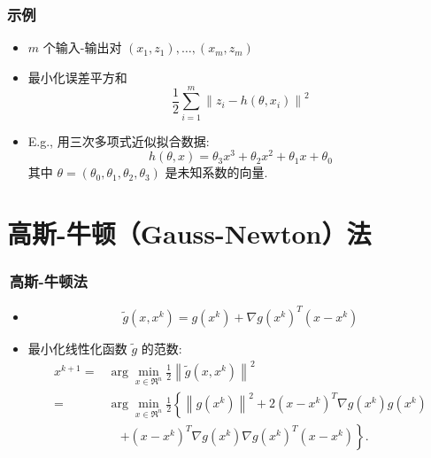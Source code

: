 \documentclass[11pt]{beamer}
\begin{document}
\begin{frame}
	\frametitle{示例}
	

	
	\begin{itemize}

\item{} $m$ 个输入-输出对 $\left(x_{1}, z_{1}\right), \ldots,\left(x_{m}, z_{m}\right)$

\item {}  最小化误差平方和
	$$
	\frac{1}{2} \sum_{i=1}^{m}\left\|z_{i}-h\left(\theta, x_{i}\right)\right\|^{2}
	$$
	\item E.g.,   用三次多项式近似拟合数据:
	$$
	h(\theta, x)=\theta_{3} x^{3}+\theta_{2} x^{2}+\theta_{1} x+\theta_{0}
	$$
	其中 $\theta=\left(\theta_{0}, \theta_{1}, \theta_{2}, \theta_{3}\right)$ 是未知系数的向量.
	\end{itemize}
	
\end{frame}



\section{高斯-牛顿（Gauss-Newton）法}

\begin{frame}
\frametitle{\secno\,高斯-牛顿法}


	\begin{itemize}

\item
$$
\tilde{g}\left(x, x^{k}\right)=g\left(x^{k}\right)+\nabla g\left(x^{k}\right)^{T}\left(x-x^{k}\right)
$$

\item  最小化线性化函数 $\tilde{g}$ 的范数:
$$
\begin{aligned}
	x^{k+1}=& \arg \min _{x \in \Re^{n}} \frac{1}{2}\left\|\tilde{g}\left(x, x^{k}\right)\right\|^{2} \\
	=& \arg \min _{x \in \Re^{n}} \frac{1}{2}\left\{\left\|g\left(x^{k}\right)\right\|^{2}\right.+2\left(x-x^{k}\right)^{T} \nabla g\left(x^{k}\right) g\left(x^{k}\right) \\
	&\quad \left.+\left(x-x^{k}\right)^{T} \nabla g\left(x^{k}\right) \nabla g\left(x^{k}\right)^{T}\left(x-x^{k}\right)\right\} .
\end{aligned}
$$	

\end{itemize}
	
\end{frame}
\end{document}
